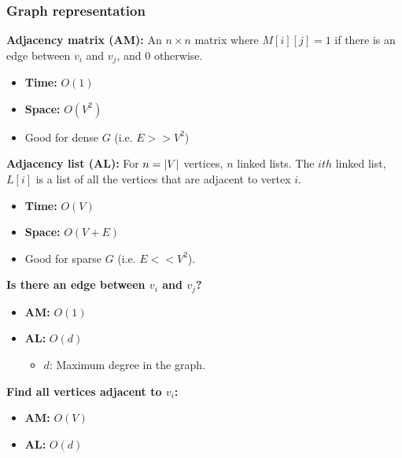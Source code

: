     \subsubsection{Graph representation}
    \begin{definition}
        
        \textbf{Adjacency matrix (AM):} An $n\times n$ matrix where $M[i][j]=1$ if there is an edge between $v_i$ and $v_j$, and $0$ otherwise.
        \begin{itemize}
            \item \textbf{Time:} $O(1)$
            \item \textbf{Space:} $O(V^2)$
            \item Good for dense $G$ (i.e. $E>>V^2$)
        \end{itemize}
        \vspace{1em}

        \textbf{Adjacency list (AL):} For $n=\abs{V}$ vertices, $n$ linked lists. The $ith$ linked list, $L[i]$ is a list of all the vertices that are adjacent to vertex $i$.
        \begin{itemize}
            \item \textbf{Time:} $O(V)$
            \item \textbf{Space:} $O(V+E)$ 
            \item Good for sparse $G$ (i.e. $E<<V^2$).
        \end{itemize}
        \vspace{1em}

        \textbf{Is there an edge between $v_i$ and $v_j$?}
        \begin{itemize}
            \item \textbf{AM:} $O(1)$
            \item \textbf{AL:} $O(d)$ 
            \begin{itemize}
                \item $d$: Maximum degree in the graph.
            \end{itemize}
        \end{itemize}
        \vspace{1em}

        \textbf{Find all vertices adjacent to $v_i$:}
        \begin{itemize}
            \item \textbf{AM:} $O(V)$ 
            \item \textbf{AL:} $O(d)$ 
        \end{itemize}
    \end{definition}

